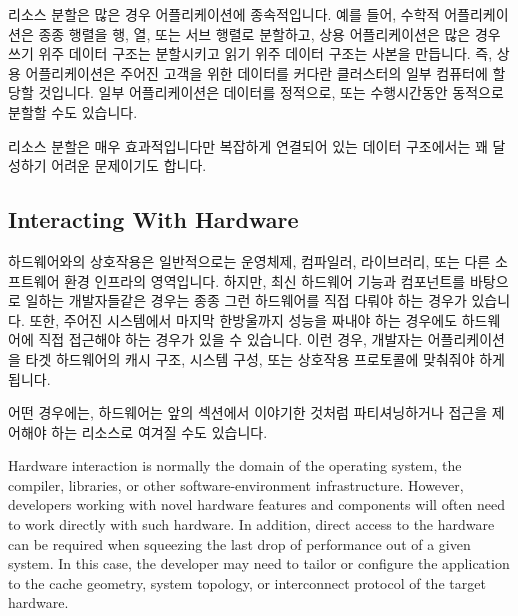 리소스 분할은 많은 경우 어플리케이션에 종속적입니다.
예를 들어, 수학적 어플리케이션은 종종 행렬을 행, 열, 또는 서브 행렬로 분할하고,
상용 어플리케이션은 많은 경우 쓰기 위주 데이터 구조는 분할시키고 읽기 위주
데이터 구조는 사본을 만듭니다.
즉, 상용 어플리케이션은 주어진 고객을 위한 데이터를 커다란 클러스터의 일부
컴퓨터에 할당할 것입니다.
일부 어플리케이션은 데이터를 정적으로, 또는 수행시간동안 동적으로 분할할 수도
있습니다.

리소스 분할은 매우 효과적입니다만 복잡하게 연결되어 있는 데이터 구조에서는 꽤
달성하기 어려운 문제이기도 합니다.

\subsection{Interacting With Hardware}
\label{sec:Interacting With Hardware}

하드웨어와의 상호작용은 일반적으로는 운영체제, 컴파일러, 라이브러리, 또는 다른
소프트웨어 환경 인프라의 영역입니다.
하지만, 최신 하드웨어 기능과 컴포넌트를 바탕으로 일하는 개발자들같은 경우는
종종 그런 하드웨어를 직접 다뤄야 하는 경우가 있습니다.
또한, 주어진 시스템에서 마지막 한방울까지 성능을 짜내야 하는 경우에도
하드웨어에 직접 접근해야 하는 경우가 있을 수 있습니다.
이런 경우, 개발자는 어플리케이션을 타겟 하드웨어의 캐시 구조, 시스템 구성, 또는
상호작용 프로토콜에 맞춰줘야 하게 됩니다.

어떤 경우에는, 하드웨어는 앞의 섹션에서 이야기한 것처럼 파티셔닝하거나 접근을
제어해야 하는 리소스로 여겨질 수도 있습니다.

\iffalse
Hardware interaction is normally the domain of the operating system,
the compiler, libraries, or other software-environment infrastructure.
However, developers working with novel hardware features and components
will often need to work directly with such hardware.
In addition, direct access to the hardware can be required when squeezing
the last drop of performance out of a given system.
In this case, the developer may need to tailor or configure the application
to the cache geometry, system topology, or interconnect protocol of the
target hardware.


